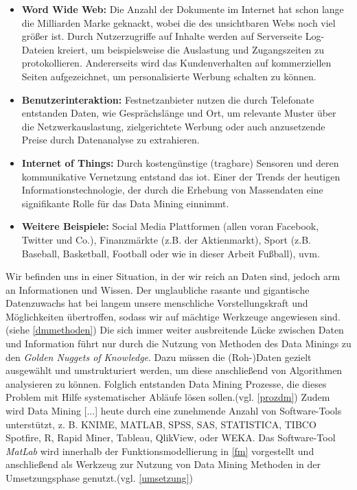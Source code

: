 \begin{itemize}
\item \textbf{Word Wide Web:} Die Anzahl der Dokumente im Internet hat schon lange die Milliarden Marke geknackt, wobei die des unsichtbaren Webs noch viel größer ist. Durch Nutzerzugriffe auf Inhalte werden auf Serverseite Log-Dateien kreiert, um beispielsweise die Auslastung und Zugangszeiten zu protokollieren. Andererseits wird das Kundenverhalten auf kommerziellen Seiten aufgezeichnet, um personalisierte Werbung schalten zu können.
\item \textbf{Benutzerinteraktion:} Festnetzanbieter nutzen die durch Telefonate entstanden Daten, wie Gesprächslänge und Ort, um relevante Muster über die Netzwerkauslastung, zielgerichtete Werbung oder auch anzusetzende Preise durch Datenanalyse zu extrahieren.
\item \textbf{Internet of Things:} Durch kostengünstige (tragbare) Sensoren und deren kommunikative Vernetzung entstand das \gls{iot}. Einer der Trends der heutigen Informationstechnologie, der durch die Erhebung von Massendaten eine signifikante Rolle für das Data Mining einnimmt.
\item \textbf{Weitere Beispiele:}  Social Media Plattformen (allen voran Facebook, Twitter und Co.), Finanzmärkte (z.B. der Aktienmarkt), Sport (z.B. Baseball, Basketball, Football oder wie in dieser Arbeit Fußball), uvm.
\end{itemize}

Wir befinden uns in einer Situation, in der wir reich an Daten sind, jedoch arm an Informationen und Wissen. Der unglaubliche rasante und gigantische Datenzuwachs hat bei langem unsere menschliche Vorstellungskraft und Möglichkeiten übertroffen, sodass wir auf mächtige Werkzeuge angewiesen sind.(siehe \vref{dmmethoden}) Die sich immer weiter ausbreitende Lücke zwischen Daten und Information führt nur durch die Nutzung von Methoden des Data Minings zu den \glqq \textit{Golden Nuggets of Knowledge}\grqq. Dazu müssen die (Roh-)Daten gezielt ausgewählt und umstrukturiert werden, um diese anschließend von Algorithmen analysieren zu können. Folglich entstanden Data Mining Prozesse, die dieses Problem mit Hilfe systematischer Abläufe lösen sollen.(vgl. \vref{prozdm}) Zudem wird \glqq Data Mining [...] heute durch eine zunehmende Anzahl von Software-Tools unterstützt, z. B. KNIME, MATLAB, SPSS, SAS, STATISTICA, TIBCO Spotfire, R, Rapid Miner, Tableau, QlikView, oder WEKA.\grqq{} Das Software-Tool \textit{MatLab} wird innerhalb der Funktionsmodellierung in \vref{fm} vorgestellt und anschließend als Werkzeug zur Nutzung von Data Mining Methoden in der Umsetzungsphase genutzt.(vgl. \vref{umsetzung})


